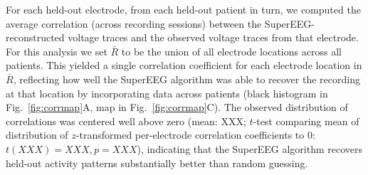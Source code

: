 \message{ !name(main.tex)}\documentclass[11pt]{article}
\begin{document}
{For each held-out electrode, from each held-out patient in turn, we
computed the average correlation (across recording sessions) between
the SuperEEG-reconstructed voltage traces and the observed voltage
traces from that electrode.  For this analysis we set $\bar{R}$ to be
the union of all electrode locations across all patients.  This
yielded a single correlation coefficient for each electrode location
in $\bar{R}$, reflecting how well the SuperEEG algorithm was able to
recover the recording at that location by incorporating data across
patients (black histogram in Fig.~\ref{fig:corrmap}A, map in
Fig.~\ref{fig:corrmap}C).  The observed distribution of correlations
was centered well above zero (mean: XXX; $t$-test comparing mean of
distribution of $z$-transformed per-electrode correlation coefficients
to 0: $t(XXX) = XXX, p = XXX$), indicating that the SuperEEG algorithm
recovers held-out activity patterns substantially better than random
guessing.

}
\end{document}
